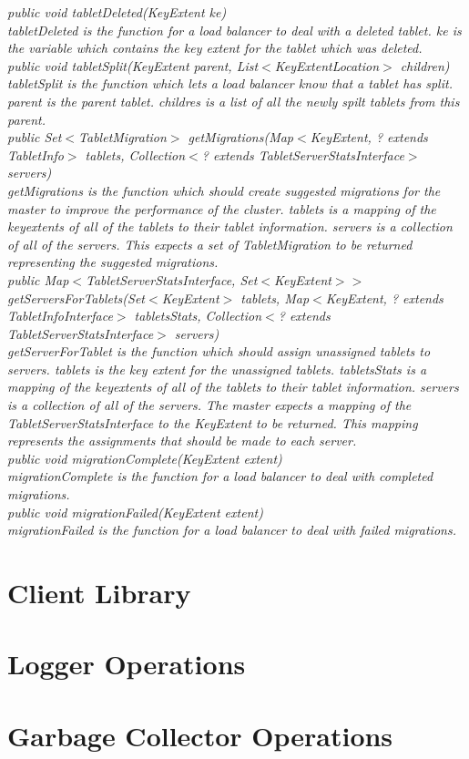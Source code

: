 \documentclass[letterpaper,onecolumn,12pt,titlepage]{article}
\begin{document}
\noindent\it public void tabletDeleted(KeyExtent ke)\rm\\
\indent tabletDeleted is the function for a load balancer to deal with a deleted tablet.
ke is the variable which contains the key extent for the tablet which was deleted.\\

\noindent\it public void tabletSplit(KeyExtent parent, List$<$KeyExtentLocation$>$ children)\rm\\
\indent tabletSplit is the function which lets a load balancer know that a tablet has split.
parent is the parent tablet.
childres is a list of all the newly spilt tablets from this parent.\\

\noindent\it public Set$<$TabletMigration$>$ getMigrations(Map$<$KeyExtent, ? extends TabletInfo$>$ tablets, Collection$<$? extends TabletServerStatsInterface$>$ servers)\rm\\
\indent getMigrations is the function which should create suggested migrations for the master to improve the performance of the cluster.
tablets is a mapping of the keyextents of all of the tablets to their tablet information. servers is a collection of all of the servers.
This expects a set of TabletMigration to be returned representing the suggested migrations.\\

\noindent\it public Map$<$TabletServerStatsInterface, Set$<$KeyExtent$>>$ getServersForTablets(Set$<$KeyExtent$>$ tablets, Map$<$KeyExtent, ? extends TabletInfoInterface$>$ tabletsStats, Collection$<$? extends TabletServerStatsInterface$>$ servers)\rm\\
\indent getServerForTablet is the function which should assign unassigned tablets to servers.
tablets is the key extent for the unassigned tablets.
tabletsStats is a mapping of the keyextents of all of the tablets to their tablet information. servers is a collection of all of the servers.
The master expects a mapping of the TabletServerStatsInterface to the KeyExtent to be returned.
This mapping represents the assignments that should be made to each server.\\

\noindent\it public void migrationComplete(KeyExtent extent)\rm\\
\indent migrationComplete is the function for a load balancer to deal with completed migrations.\\

\noindent\it public void migrationFailed(KeyExtent extent)\rm\\
\indent migrationFailed is the function for a load balancer to deal with failed migrations.\\

\section{Client Library}
\section{Logger Operations}
\section{Garbage Collector Operations}
\end{document}
